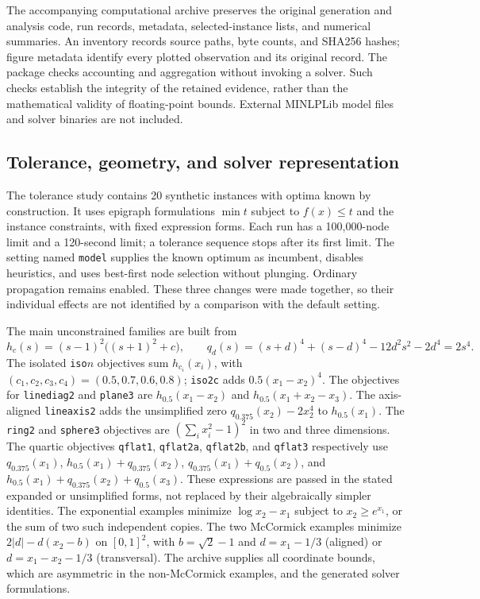 The accompanying computational archive preserves the original generation
and analysis code, run records, metadata, selected-instance lists, and
numerical summaries. An inventory records source paths, byte counts, and
SHA256 hashes; figure metadata identify every plotted observation and its
original record. The package checks accounting and aggregation without
invoking a solver. Such checks establish the integrity of the retained
evidence, rather than the mathematical validity of floating-point bounds.
External MINLPLib model files and solver binaries are not included.

\subsection{Tolerance, geometry, and solver representation}
\label{experiments:tolerance}

The tolerance study contains 20 synthetic instances with optima known by
construction. It uses epigraph formulations $\min t$ subject to
$f(x)\leq t$ and the instance constraints, with fixed expression forms.
Each run has a 100,000-node limit and a 120-second limit; a tolerance
sequence stops after its first limit. The setting named \texttt{model}
supplies the known optimum as incumbent, disables heuristics, and uses
best-first node selection without plunging. Ordinary propagation remains
enabled. These three changes were made together, so their individual
effects are not identified by a comparison with the default setting.

The main unconstrained families are built from
\[
 h_c(s)=(s-1)^2\big((s+1)^2+c\big),\qquad
 q_d(s)=(s+d)^4+(s-d)^4-12d^2s^2-2d^4=2s^4.
\]
The isolated \texttt{iso}$n$ objectives sum $h_{c_i}(x_i)$, with
$(c_1,c_2,c_3,c_4)=(0.5,0.7,0.6,0.8)$; \texttt{iso2c} adds
$0.5(x_1-x_2)^4$. The objectives for \texttt{linediag2} and
\texttt{plane3} are $h_{0.5}(x_1-x_2)$ and
$h_{0.5}(x_1+x_2-x_3)$. The axis-aligned \texttt{lineaxis2} adds
the unsimplified zero $q_{0.375}(x_2)-2x_2^4$ to $h_{0.5}(x_1)$.
The \texttt{ring2} and \texttt{sphere3} objectives are
$(\sum_i x_i^2-1)^2$ in two and three dimensions.
The quartic objectives \texttt{qflat1}, \texttt{qflat2a},
\texttt{qflat2b}, and \texttt{qflat3} respectively use $q_{0.375}(x_1)$,
$h_{0.5}(x_1)+q_{0.375}(x_2)$,
$q_{0.375}(x_1)+q_{0.5}(x_2)$, and
$h_{0.5}(x_1)+q_{0.375}(x_2)+q_{0.5}(x_3)$.
These expressions are passed in the stated expanded or unsimplified
forms, not replaced by their algebraically simpler identities.
The exponential examples minimize $\log x_2-x_1$ subject to
$x_2\geq e^{x_1}$, or the sum of two such independent copies.
The two McCormick examples minimize
$2|d| - d(x_2-b)$ on $[0,1]^2$, with $b=\sqrt2-1$ and
$d=x_1-1/3$ (aligned) or $d=x_1-x_2-1/3$ (transversal).
The archive supplies all coordinate bounds, which are asymmetric in the
non-McCormick examples, and the generated solver formulations.

